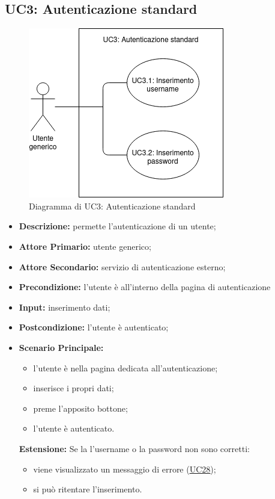 \subsection{UC3: Autenticazione standard}
\begin{figure}[!ht]
    \caption{Diagramma di UC3: Autenticazione standard}
    \vspace{10px}
    \includegraphics[scale=0.5]{../../../Images/AnalisiRequisiti/UC03}
    \centering
\end{figure}
\label{sec:UC3}
\begin{itemize}
    \item \textbf{Descrizione:} permette l'autenticazione di un utente;
    \item \textbf{Attore Primario:} utente generico;
    \item \textbf{Attore Secondario:} servizio di autenticazione esterno;
    \item \textbf{Precondizione:} l'utente è all'interno della pagina di autenticazione
    \item \textbf{Input:} inserimento dati;
    \item \textbf{Postcondizione:} l'utente è autenticato;
    \item \textbf{Scenario Principale:}
          \begin{itemize}
              \item l'utente è nella pagina dedicata all'autenticazione;
              \item inserisce i propri dati;
              \item preme l'apposito bottone;
              \item l'utente è autenticato.
          \end{itemize}
          \textbf{Estensione:}
          Se la l'username o la password non sono corretti:
          \begin{itemize}
              \item viene visualizzato un messaggio di errore (\hyperref[sec:UC28]{\underline{UC28}});
              \item si può ritentare l'inserimento.
          \end{itemize}
\end{itemize}
